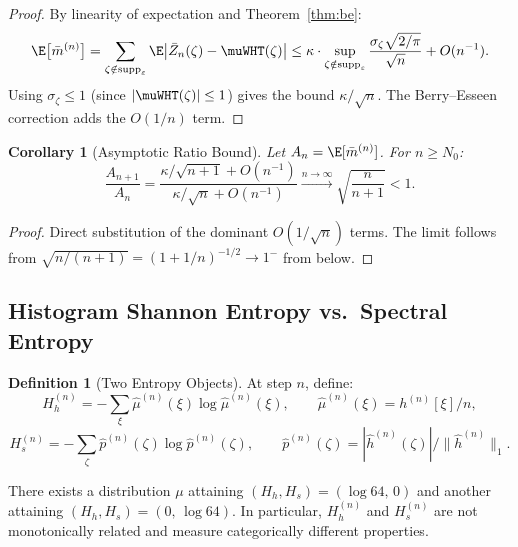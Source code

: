 \documentclass[12pt,letterpaper]{article}
\theoremstyle{definition}
\newtheorem{definition}{Definition}[section]
\theoremstyle{plain}
\newtheorem{corollary}[theorem]{Corollary}
\theoremstyle{remark}
\newcommand{\supp}{\operatorname{supp}}
\newcommand{\hhat}{\hat{h}}
\newcommand{\mbar}{\bar{m}}
\begin{document}
\begin{proof}
By linearity of expectation and Theorem~\ref{thm:be}:
\[
  \E\bigl[\mbar^{(n)}\bigr]
    = \sum_{\zeta\notin\supp_\varepsilon}
        \E\!\left|\bar{Z}_n(\zeta)-\muWHT(\zeta)\right|
    \le \kappa \cdot \sup_{\zeta\notin\supp_\varepsilon}
        \frac{\sigma_\zeta\sqrt{2/\pi}}{\sqrt{n}}
        + O(n^{-1}).
\]
Using $\sigma_\zeta \le 1$ (since $|\muWHT(\zeta)| \le 1$) gives the
bound $\kappa/\sqrt{n}$.  The Berry--Esseen correction adds the
$O(1/n)$ term.
\end{proof}

\begin{corollary}[Asymptotic Ratio Bound]
\label{cor:ratio}
Let $A_n = \E[\mbar^{(n)}]$.  For $n \ge N_0$:
\[
  \frac{A_{n+1}}{A_n}
    = \frac{\kappa/\sqrt{n+1} + O(n^{-1})}{\kappa/\sqrt{n}   + O(n^{-1})}
    \xrightarrow{n\to\infty} \sqrt{\frac{n}{n+1}} < 1.
\]
\end{corollary}

\begin{proof}
Direct substitution of the dominant $O(1/\sqrt{n})$ terms.  The limit
follows from $\sqrt{n/(n+1)} = (1 + 1/n)^{-1/2} \to 1^-$ from below.
\end{proof}

\subsection{Histogram Shannon Entropy vs.\ Spectral Entropy}

\begin{definition}[Two Entropy Objects]
At step $n$, define:
\[
  H_h^{(n)} = -\sum_\xi \hat\mu^{(n)}(\xi)\log\hat\mu^{(n)}(\xi),
  \qquad \hat\mu^{(n)}(\xi) = h^{(n)}[\xi]/n,
\]
\[
  H_s^{(n)} = -\sum_\zeta \hat{p}^{(n)}(\zeta)\log\hat{p}^{(n)}(\zeta),
  \qquad \hat{p}^{(n)}(\zeta) = |\hhat^{(n)}(\zeta)|/\|\hhat^{(n)}\|_1.
\]
\end{definition}

\begin{proposition}
\label{prop:entropy-separation}
There exists a distribution $\mu$ attaining $(H_h, H_s) = (\log 64,\, 0)$
and another attaining $(H_h, H_s) = (0,\, \log 64)$.  In particular,
$H_h^{(n)}$ and $H_s^{(n)}$ are not monotonically related and measure
categorically different properties.
\end{proposition}
\end{document}
